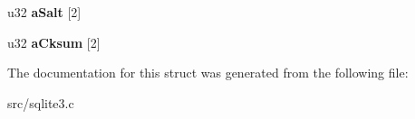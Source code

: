 \begin{DoxyCompactItemize}
\item 
\hypertarget{struct_wal_index_hdr_af99b92f673fd7ba1e4e4f9feb955453f}{u32 {\bfseries a\-Salt} \mbox{[}2\mbox{]}}\label{struct_wal_index_hdr_af99b92f673fd7ba1e4e4f9feb955453f}

\item 
\hypertarget{struct_wal_index_hdr_aa202339b02766d088717bfce9e3a9c0e}{u32 {\bfseries a\-Cksum} \mbox{[}2\mbox{]}}\label{struct_wal_index_hdr_aa202339b02766d088717bfce9e3a9c0e}

\end{DoxyCompactItemize}


The documentation for this struct was generated from the following file\-:\begin{DoxyCompactItemize}
\item 
src/sqlite3.\-c\end{DoxyCompactItemize}

